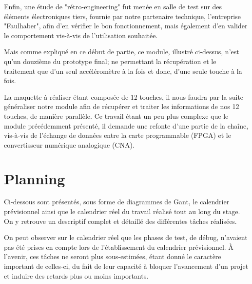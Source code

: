 \documentclass[french,a4paper,12pt]{report}
\begin{document}
	Enfin, une étude de "rétro-engineering" fut menée en salle de test sur des éléments électroniques tiers, fournie par notre partenaire technique, l'entreprise "Faulhaber", afin d'en vérifier le bon fonctionnement, mais également d'en valider le comportement vis-à-vis de l'utilisation souhaitée.
	
	Mais comme expliqué en ce début de partie, ce module, illustré ci-dessus, n'est qu'un douzième du prototype final; ne permettant la récupération et le traitement que d'un seul accéléromètre à la fois et donc, d'une seule touche à la fois.
	
	La maquette à réaliser étant composée de 12 touches, il nous faudra par la suite généraliser notre module afin de récupérer et traiter les informations de nos 12 touches, de manière parallèle.
	Ce travail étant un peu plus complexe que le module précédemment présenté, il demande une refonte d'une partie de la chaîne, vis-à-vis de l'échange de données entre la carte programmable (FPGA) et le convertisseur numérique analogique (CNA).
	
	\chapter{Planning}

	Ci-dessous sont présentés, sous forme de diagrammes de Gant, le calendrier prévisionnel ainsi que le calendrier réel du travail réalisé tout au long du stage.
	On y retrouve un descriptif complet et détaillé des différentes tâches réalisées.
	
	On peut observer sur le calendrier réel que les phases de test, de débug, n'avaient pas été prises en compte lors de l'établissement du calendrier prévisionnel.
	À l'avenir, ces tâches ne seront plus sous-estimées, étant donné le caractère important de celles-ci, du fait de leur capacité à bloquer l'avancement d'un projet et induire des retards plus ou moins importants.
	
	
	
	
	
		
	
	
	
	
%
%
	
\end{document}
